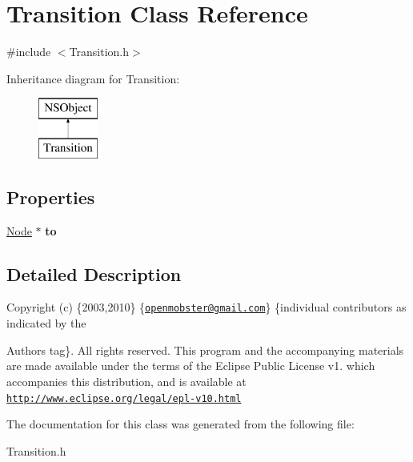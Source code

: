 \hypertarget{interface_transition}{
\section{\-Transition \-Class \-Reference}
\label{interface_transition}
}


{\ttfamily \#include $<$\-Transition.\-h$>$}

\-Inheritance diagram for \-Transition\-:\begin{figure}[H]
\begin{center}
\leavevmode
\includegraphics[height=2.000000cm]{interface_transition}
\end{center}
\end{figure}
\subsection*{\-Properties}
\begin{DoxyCompactItemize}
\item 
\hypertarget{interface_transition_a881f5101098e52ace66bb5551629c635}{
\hyperlink{interface_node}{\-Node} $\ast$ {\bfseries to}}
\label{interface_transition_a881f5101098e52ace66bb5551629c635}

\end{DoxyCompactItemize}


\subsection{\-Detailed \-Description}
\-Copyright (c) \{2003,2010\} \{\href{mailto:openmobster@gmail.com}{\tt openmobster@gmail.\-com}\} \{individual contributors as indicated by the \begin{DoxyAuthor}{\-Authors}
tag\}. \-All rights reserved. \-This program and the accompanying materials are made available under the terms of the \-Eclipse \-Public \-License v1. which accompanies this distribution, and is available at \href{http://www.eclipse.org/legal/epl-v10.html}{\tt http\-://www.\-eclipse.\-org/legal/epl-\/v10.\-html} 
\end{DoxyAuthor}


\-The documentation for this class was generated from the following file\-:\begin{DoxyCompactItemize}
\item 
\-Transition.\-h\end{DoxyCompactItemize}
